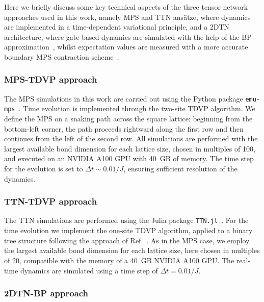 \documentclass[aps,pra,reprint,amssymb,superscriptaddress]{revtex4-2}
\begin{document}
Here we briefly discuss some key technical aspects of the three tensor network approaches used in this work, namely MPS and TTN ansätze, where dynamics are implemented in a time-dependent variational principle, and a 2DTN architecture, where gate-based dynamics are simulated with the help of the BP approximation~\cite{jiang_accurate_2008, alkabetz_tensor_2021, tindall_gauging_2023}, whilst expectation values are measured with a more accurate boundary MPS contraction scheme~\cite{lubasch_algorithms_2014,verstraete_renormalization_2004, rudolph_simulating_2025}.

\subsubsection{MPS-TDVP  approach}

The MPS simulations in this work are carried out using the Python package \texttt{emu-mps}~\cite{bidzhiev_efficient_2025}. 
Time evolution is implemented through the two-site TDVP algorithm. 
We define the MPS on a snaking path across the square lattice: beginning from the bottom-left corner, the path proceeds rightward along the first row and then continues from the left of the second row. 
All simulations are performed with the largest available bond dimension for each lattice size, chosen in multiples of 100, and executed on an NVIDIA A100 GPU with 40~GB of memory. 
The time step for the evolution is set to $\Delta t \sim 0.01/J$, ensuring sufficient resolution of the dynamics. 

\subsubsection{TTN-TDVP approach}

The TTN simulations are performed using the Julia package \texttt{TTN.jl}~\cite{tausendpfund_ttnjl_2024}. 
For the time evolution we implement the one-site TDVP algorithm, applied to a binary tree structure following the approach of Ref.~\cite{krinitsin_time_2025}. 
As in the MPS case, we employ the largest available bond dimension for each lattice size, here chosen in multiples of 20, compatible with the memory of a 40~GB NVIDIA A100 GPU. The real-time dynamics are simulated using a time step of $\Delta t = 0.01/J$. 


\subsubsection{2DTN-BP approach}
\end{document}

